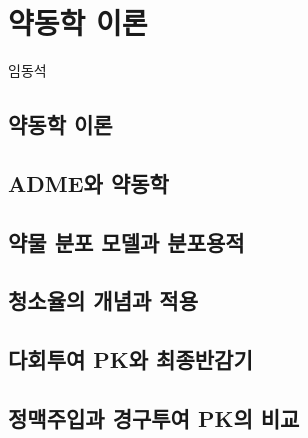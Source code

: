 \documentclass[
  11pt,
  krantz2, a4paper, twoside]{krantz}
\begin{document}
\normalsize

\mainmatter

\hypertarget{principle}{%
\chapter{약동학 이론}\label{principle}}

\Large\hfill

임동석
\normalsize

\hypertarget{uxc57duxb3d9uxd559-uxc774uxb860}{%
\section{약동학 이론}\label{uxc57duxb3d9uxd559-uxc774uxb860}}

\hypertarget{admeuxc640-uxc57duxb3d9uxd559}{%
\section{ADME와 약동학}\label{admeuxc640-uxc57duxb3d9uxd559}}

\hypertarget{uxc57duxbb3c-uxbd84uxd3ec-uxbaa8uxb378uxacfc-uxbd84uxd3ecuxc6a9uxc801}{%
\section{약물 분포 모델과 분포용적}\label{uxc57duxbb3c-uxbd84uxd3ec-uxbaa8uxb378uxacfc-uxbd84uxd3ecuxc6a9uxc801}}

\hypertarget{uxccaduxc18cuxc728uxc758-uxac1cuxb150uxacfc-uxc801uxc6a9}{%
\section{청소율의 개념과 적용}\label{uxccaduxc18cuxc728uxc758-uxac1cuxb150uxacfc-uxc801uxc6a9}}

\hypertarget{uxb2e4uxd68cuxd22cuxc5ec-pkuxc640-uxcd5cuxc885uxbc18uxac10uxae30}{%
\section{다회투여 PK와 최종반감기}\label{uxb2e4uxd68cuxd22cuxc5ec-pkuxc640-uxcd5cuxc885uxbc18uxac10uxae30}}

\hypertarget{uxc815uxb9e5uxc8fcuxc785uxacfc-uxacbduxad6cuxd22cuxc5ec-pkuxc758-uxbe44uxad50}{%
\section{정맥주입과 경구투여 PK의 비교}\label{uxc815uxb9e5uxc8fcuxc785uxacfc-uxacbduxad6cuxd22cuxc5ec-pkuxc758-uxbe44uxad50}}
\end{document}
